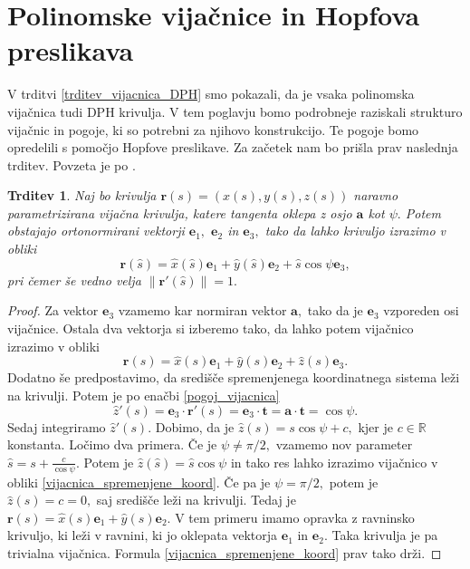\documentclass[12pt,a4paper,twoside]{article}
\theoremstyle{definition} %
\theoremstyle{plain} %
\newtheorem{trditev}[definicija]{Trditev}
\theoremstyle{primerstyle}
\numberwithin{equation}{section}  %
\newcommand{\R}{\mathbb R}
\newcommand{\tV}{\mathbf{t}}
\newcommand{\aV}{\mathbf{a}}
\newcommand{\eV}{\mathbf{e}}
\newcommand{\rV}{\mathbf{r}}
\begin{document}
\section{Polinomske vijačnice in Hopfova preslikava}

V trditvi \ref{trditev_vijacnica_DPH} smo pokazali, da je vsaka polinomska vijačnica tudi DPH krivulja. V tem poglavju bomo podrobneje raziskali strukturo vijačnic in pogoje, ki so potrebni za njihovo konstrukcijo. Te pogoje bomo opredelili s pomočjo Hopfove preslikave. Za začetek nam bo prišla prav naslednja trditev. Povzeta je po \cite[str.\ 72]{lipschutz1969schaum}.
\begin{trditev}
	Naj bo krivulja $\rV(s)=(x(s),y(s),z(s))$ naravno parametrizirana vijačna krivulja, katere tangenta oklepa z osjo $\aV$ kot $\psi.$ Potem obstajajo ortonormirani vektorji $\eV_1,$ $\eV_2$ in $\eV_3,$ tako da lahko krivuljo izrazimo v obliki
	\begin{equation}
		\label{vijacnica_spremenjene_koord}
		\rV(\hat{s})=\hat{x}(\hat{s})\eV_1+\hat{y}(\hat{s})\eV_2+\hat{s}\cos\psi\eV_3,
	\end{equation}
	pri čemer še vedno velja $\lVert\rV'(\hat{s})\rVert=1.$
\end{trditev}
\begin{proof}
	Za vektor $\eV_3$ vzamemo kar normiran vektor $\aV,$ tako da je $\eV_3$ vzporeden osi vijačnice. Ostala dva vektorja si izberemo tako, da lahko potem vijačnico izrazimo v obliki
	\begin{equation*}
		\rV(s)=\hat{x}(s)\eV_1+\hat{y}(s)\eV_2+\hat{z}(s)\eV_3.
	\end{equation*}
	Dodatno še predpostavimo, da središče spremenjenega koordinatnega sistema leži na krivulji. Potem je po enačbi \eqref{pogoj_vijacnica} 
	\begin{equation*}
	\hat{z}'(s)=\eV_3\cdot\rV'(s)=\eV_3\cdot\tV=\aV\cdot\tV=\cos\psi.
	\end{equation*}
	Sedaj integriramo $\hat{z}'(s).$ Dobimo, da je $\hat{z}(s)=s\cos\psi+c,$ kjer je $c\in\R$ konstanta. Ločimo dva primera. Če je $\psi\neq \pi/2,$ vzamemo nov parameter $\hat{s}=s+\frac{c}{\cos\psi}.$ Potem je $\hat{z}(\hat{s})=\hat{s}\cos\psi$ in tako res lahko izrazimo vijačnico v obliki \eqref{vijacnica_spremenjene_koord}. Če pa je $\psi=\pi/2,$ potem je $\hat{z}(s)=c=0,$ saj središče leži na krivulji. Tedaj je $\rV(s)=\hat{x}(s)\eV_1+\hat{y}(s)\eV_2.$ V tem primeru imamo opravka z ravninsko krivuljo, ki leži v ravnini, ki jo oklepata vektorja $\eV_1$ in $\eV_2.$ Taka krivulja je pa trivialna vijačnica. Formula \eqref{vijacnica_spremenjene_koord} prav tako drži.
\end{proof}
\end{document}
